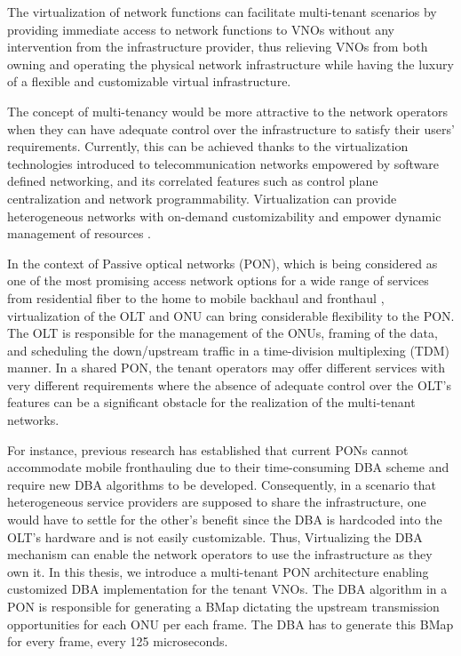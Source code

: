 The virtualization of network functions can facilitate multi-tenant scenarios by providing immediate access to network functions to \acp{VNO} without any intervention from the infrastructure provider, thus relieving \acp{VNO} from both owning and operating the physical network infrastructure while having the luxury of a flexible and customizable virtual infrastructure. 

The concept of multi-tenancy would be more attractive to the network operators when they can have adequate control over the infrastructure to satisfy their users' requirements. Currently, this can be achieved thanks to the virtualization technologies introduced to telecommunication networks empowered by software defined networking, and its correlated features such as control plane centralization and network programmability. Virtualization can provide heterogeneous networks with on-demand customizability and empower dynamic management of resources \cite{7929272}.

In the context of Passive optical networks (PON), which is being considered as one of the most promising access network options for a wide range of services from residential fiber to the home to mobile backhaul and fronthaul \cite{7592399}, virtualization of the \ac{OLT} and ONU can bring considerable flexibility to the PON. The \ac{OLT} is responsible for the management of the ONUs, framing of the data, and scheduling the down/upstream traffic in a time-division multiplexing (TDM) manner. In a shared \ac{PON}, the tenant operators may offer different services with very different requirements where the absence of adequate control over the \ac{OLT}'s features can be a significant obstacle for the realization of the multi-tenant networks.

For instance, previous research \cite{6886953} has established that current \acp{PON} cannot accommodate mobile fronthauling due to their time-consuming \ac{DBA} scheme and require new \ac{DBA} algorithms to be developed. Consequently, in a scenario that heterogeneous service providers are supposed to share the infrastructure, one would have to settle for the other's benefit since the \ac{DBA} is hardcoded into the \ac{OLT}'s hardware and is not easily customizable. Thus, Virtualizing the \ac{DBA} mechanism can enable the network operators to use the infrastructure as they own it. 
In this thesis, we introduce a multi-tenant \ac{PON} architecture enabling customized \ac{DBA} implementation for the tenant \acp{VNO}. The \ac{DBA} algorithm in a \ac{PON} is responsible for generating a \ac{BMap} dictating the upstream transmission opportunities for each ONU per each frame. The \ac{DBA} has to generate this \ac{BMap} for every frame, every 125 microseconds.

